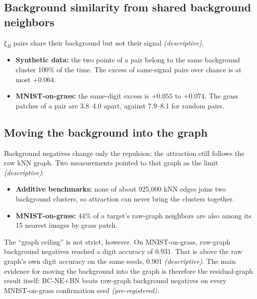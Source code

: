 \documentclass[10pt]{article}
\newcommand{\methodname}{BC-NE}
\newcommand{\BN}{\methodname{}+BN}
\newcommand{\cpre}{\textit{\small (pre-registered)}}
\newcommand{\cdesc}{\textit{\small (descriptive)}}
\newcommand{\xiB}{\xi_{B}}
\begin{document}
\subsection{Background similarity from shared background neighbors}
\label{sec:dec-jaccard}

$\xiB$ pairs share their background but not their signal \cdesc.
\begin{itemize}
  \item \textbf{Synthetic data:} the two points of a pair belong to the same background cluster 100\% of the time. The excess of same-signal pairs over chance is at most $+0.064$.
  \item \textbf{MNIST-on-grass:} the same-digit excess is $+0.055$ to $+0.074$. The grass patches of a pair are 3.8--4.0 apart, against 7.9--8.1 for random pairs.
\end{itemize}

\subsection{Moving the background into the graph}
\label{sec:dec-graph}

Background negatives change only the repulsion; the attraction still follows the raw kNN graph. Two measurements pointed to that graph as the limit \cdesc:
\begin{itemize}
  \item \textbf{Additive benchmarks:} none of about 925{,}000 kNN edges joins two background clusters, so attraction can never bring the clusters together.
  \item \textbf{MNIST-on-grass:} 44\% of a target's raw-graph neighbors are also among its 15 nearest images by grass patch.
\end{itemize}

The ``graph ceiling'' is not strict, however. On MNIST-on-grass, raw-graph background negatives reached a digit accuracy of 0.931. That is above the raw graph's own digit accuracy on the same seeds, 0.901 \cdesc. The main evidence for moving the background into the graph is therefore the residual-graph result itself: \BN{} beats raw-graph background negatives on every MNIST-on-grass confirmation seed \cpre.
\end{document}
